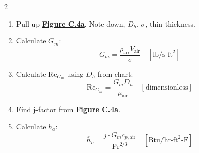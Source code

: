 \begin{multicols*}{2}
\begin{enumerate}
\begin{itemize}
                        \begin{enumerate}
                            \item Pull up \underline{\textbf{Figure C.4a}}. Note down, $D_h$, $\sigma$, thin thickness.
                            \item Calculate $G_m$:
                                  \[
                                      G_m = \frac{\rho_\text{air} V_\text{air}}{\sigma} \quad [\text{lb/s-ft}^2]
                                  \]
                            \item Calculate Re$_{G_{m}}$ using $D_h$ from chart:
                                  \[
                                      \text{Re}_{G_m} = \frac{G_m D_h}{\mu_\text{air}} \quad [\text{dimensionless}]
                                  \]
                            \item Find j-factor from \underline{\textbf{Figure C.4a}}.
                            \item Calculate $h_o$:
                                  \[
                                      \overline{h}_o = \frac{j \cdot G_m c_{p, \text{air}}}{\text{Pr}^{2/3}} \quad [\text{Btu/hr-ft}^2\text{-F}]
                                  \]
                        \end{enumerate}


\end{itemize}
\end{enumerate}
\end{multicols*}
